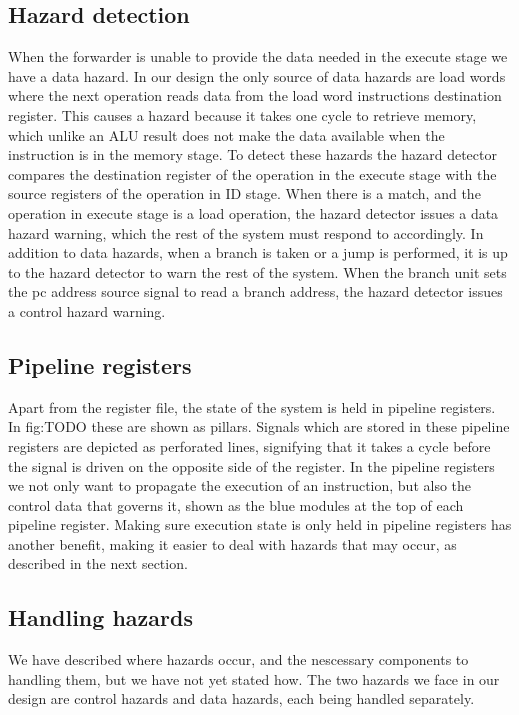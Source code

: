\subsection{Hazard detection}
When the forwarder is unable to provide the data needed in the execute stage we have a data hazard. In our design the only source of data hazards are load words where the next operation reads data from the load word instructions destination register. 
This causes a hazard because it takes one cycle to retrieve memory, which unlike an ALU result does not make the data available when the instruction is in the memory stage. 
To detect these hazards the hazard detector compares the destination register of the operation in the execute stage with the source registers of the operation in ID stage.
When there is a match, and the operation in execute stage is a load operation, the hazard detector issues a data hazard warning, which the rest of the system must respond to accordingly.
In addition to data hazards, when a branch is taken or a jump is performed, it is up to the hazard detector to warn the rest of the system.
When the branch unit sets the pc address source signal to read a branch address, the hazard detector issues a control hazard warning.

\subsection{Pipeline registers}
Apart from the register file, the state of the system is held in pipeline registers. In fig:TODO these are shown as pillars.
Signals which are stored in these pipeline registers are depicted as perforated lines, signifying that it takes a cycle before the signal is driven on the opposite side of the register.
In the pipeline registers we not only want to propagate the execution of an instruction, but also the control data that governs it, shown as the blue modules at the top of each pipeline register.
Making sure execution state is only held in pipeline registers has another benefit, making it easier to deal with hazards that may occur, as described in the next section.

\subsection{Handling hazards}
We have described where hazards occur, and the nescessary components to handling them, but we have not yet stated how.
The two hazards we face in our design are control hazards and data hazards, each being handled separately.

